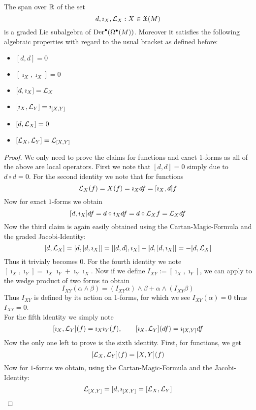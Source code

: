 \begin{prop}
  The span over $\mathbb{R}$ of the set
  $$ {d, \imath_X, \mathcal{L}_{X}: X \in \mathfrak{X}(M)} $$
  is a graded Lie subalgebra of $\operatorname{Der}^\bullet(\Omega^\bullet(M))$. Moreover it satisfies the following algebraic properties with regard to the usual bracket as defined before:
  \begin{multicols}{3}
    \begin{itemize}
      \item[(1)] $[d,d] = 0$
      \item[(4)] $[\imath_X, \imath_X] = 0$
      \item[(2)] $[d, \imath_X] = \mathcal{L}_{X}$
      \item[(5)] $[\imath_X, \mathcal{L}_{Y}] = \imath_{[X,Y]}$
      \item[(3)] $[d, \mathcal{L}_{X}] = 0$
      \item[(6)] $[\mathcal{L}_{X}, \mathcal{L}_{Y}] = \mathcal{L}_{[X,Y]}$
    \end{itemize}
\end{multicols}
  \begin{proof}
    We only need to prove the claims for functions and exact $1$-forms as all of the above are local operators. First we note that $[d,d]=0$ simply due to $d \circ d = 0$. For the second identity we note that for functions
    $$ \mathcal{L}_{X}(f) = X(f) = \imath_X df = [\imath_X, d]f $$
    Now for exact $1$-forms we obtain
    $$ [d, \imath_X] df = d\circ \imath_X df = d \circ \mathcal{L}_{X}f = \mathcal{L}_{X} df $$
    Now the third claim is again easily obtained using the Cartan-Magic-Formula and the graded Jacobi-Identity:
    $$ [d, \mathcal{L}_{X}] = [d,[d,\imath_X]] = [[d,d],\imath_X] - [d,[d,\imath_X]] = - [d, \mathcal{L}_{X}]$$
    Thus it trivialy becomes $0$. For the fourth identity we note $[\imath_X, \imath_Y] = \imath_X \imath_Y + \imath_Y \imath_X$. Now if we define $I_{XY} := [\imath_X, \imath_Y]$, we can apply to the wedge product of two forms to obtain
    $$ I_{XY} (\alpha \wedge \beta) = (I_{XY}\alpha) \wedge \beta +  \alpha \wedge (I_{XY}\beta) $$
    Thus $I_{XY}$ is defined by its action on 1-forms, for which we see $I_{XY}(\alpha) = 0$ thus $I_{XY} =0$.\\
    For the fifth identity we simply note
    $$ [\imath_X, \mathcal{L}_{Y}](f) = \imath_X \imath_Y (f), \quad \quad [\imath_X, \mathcal{L}_{Y}](df) = \imath_{[X,Y]} df $$
    Now the only one left to prove is the sixth identity. First, for functions, we get
    $$ [\mathcal{L}_{X}, \mathcal{L}_{Y}] (f) = [X,Y](f) $$
    Now for $1$-forms we obtain, using the Cartan-Magic-Formula and the Jacobi-Identity:
    $$ \mathcal{L}_{[X,Y]} = [d, \imath_{[X,Y]} = [\mathcal{L}_{X}, \mathcal{L}_{Y}]$$
  \end{proof}
\end{prop}

